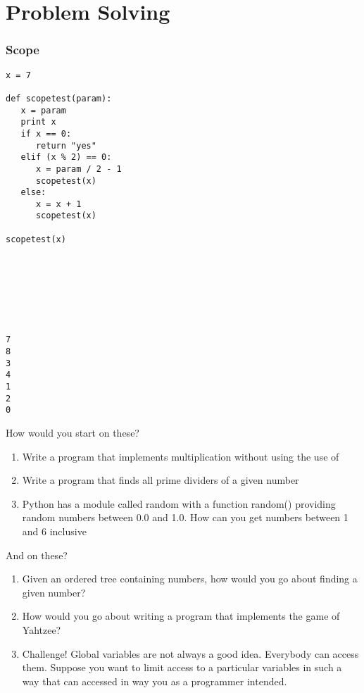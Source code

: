 \section{Problem Solving}

\begin{frame}[fragile]\frametitle{Scope}
\begin{multicols}{2}
\codelist
\begin{lstlisting}[linewidth=8cm]
x = 7

def scopetest(param):
   x = param
   print x
   if x == 0:
      return "yes"
   elif (x % 2) == 0:
      x = param / 2 - 1
      scopetest(x)
   else:
      x = x + 1
      scopetest(x)	

scopetest(x)	
\end{lstlisting}
\mbox{}\\
\mbox{}\\
\mbox{}\\
\mbox{}\\
\mbox{}\\
\reslist
\begin{lstlisting}[linewidth=2cm]
7
8
3
4
1
2
0
\end{lstlisting}
\end{multicols}
\end{frame}

\begin{frame}{How would you start on these?}
\begin{enumerate}[<+->]
\item Write a program that implements multiplication without using the use of \keytext{*}
\item Write a program that finds all prime dividers of a given number
\item Python has a module called random with a function random() providing random numbers between 0.0 and 1.0. How can you get numbers between 1 and 6 inclusive
\end{enumerate}
\end{frame}

\begin{frame}{And on these?}
\begin{enumerate}[<+->]
\item Given an ordered tree containing numbers, how would you go about finding a given number?
\item How would you go about writing a program that implements the game of Yahtzee?
\item Challenge! Global variables are not always a good idea. Everybody can access them. Suppose you want to limit access to a particular variables in such a way that can accessed in way you as a programmer intended.
\end{enumerate}
\end{frame}


